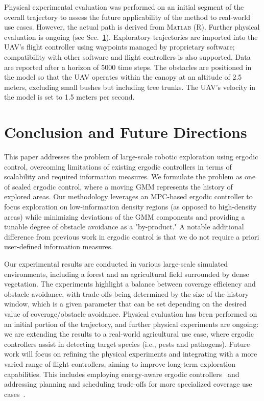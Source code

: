 \documentclass[letterpaper,10pt,conference,twoside]{IEEEtran}
\theoremstyle{definition}
\begin{document}
Physical experimental evaluation was performed on an initial segment of the overall trajectory to assess the future applicability of the method to real-world use cases. However, the actual path is derived from \textsc{Matlab} (R). Further physical evaluation is ongoing (see Sec.~\ref{sec:conc}). Exploratory trajectories are imported into the UAV's flight controller using waypoints managed by proprietary software; compatibility with other software and flight controllers is also supported. Data are reported after a horizon of 5000 time steps. The obstacles are positioned in the model so that the UAV operates within the canopy at an altitude of 2.5 meters, excluding small bushes but including tree trunks. The UAV's velocity in the model is set to 1.5 meters per second.



\section{Conclusion and Future Directions}\label{sec:conc}
\noindent
This paper addresses the problem of large-scale robotic exploration using ergodic control, overcoming limitations of existing ergodic controllers in terms of scalability and required information measures. We formulate the problem as one of scaled ergodic control, where a moving GMM represents the history of explored areas. Our methodology leverages an MPC-based ergodic controller to focus exploration on low-information density regions (as opposed to high-density areas) while minimizing deviations of the GMM components and providing a tunable degree of obstacle avoidance as a "by-product." A notable  additional difference from previous work in ergodic control is that we do not require a priori user-defined information measures. %

Our experimental results are conducted in various large-scale simulated environments, including a forest and an agricultural field surrounded by dense vegetation. The experiments highlight a balance between coverage efficiency and obstacle avoidance, with trade-offs being determined by the size of the history window, which is a given parameter that can be set depending on the desired value of coverage/obstacle avoidance. Physical evaluation has been performed on an initial portion of the trajectory, and further physical experiments are ongoing: we are extending the results to a real-world agricultural use case, where ergodic controllers assist in detecting target species (i.e., pests and pathogens). Future work will focus on refining the physical experiments and integrating with a more varied range of flight controllers, aiming to improve long-term exploration capabilities. This includes employing energy-aware ergodic controllers~\cite{seewald2024energy,naveed2024eclares} and addressing planning and scheduling trade-offs for more specialized coverage use cases~\cite{seewald2022energy,seewaldphdthesis}.




{\small
 

}
\end{document}

